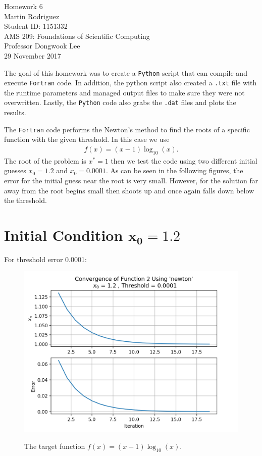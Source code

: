 \documentclass[12pt]{article}
\begin{document}
\begin{center}
	{\LARGE Homework 6} \\[10pt] 
	{ Martin Rodriguez} \\
	Student ID: 1151332\\
	AMS 209: Foundations of Scientific Computing\\
	Professor Dongwook Lee\\[10 pt]	
	29 November 2017 \\[30 pt]
\end{center}

The goal of this homework was to create a \texttt{Python} script that can compile and execute \texttt{Fortran} code. In addition, the python script also created a \texttt{.txt} file with the runtime parameters and managed output files to make sure they were not overwritten. Lastly, the \texttt{Python} code also grabs the \texttt{.dat} files and plots the results.

The \texttt{Fortran} code performs the Newton's method to find the roots of a specific function with the given threshold. In this case we use
\begin{align}
	f(x) = (x-1)\log_{10}(x).
\end{align} 
The root of the problem is $x^* = 1$ then we test the code using two different initial guesses $x_0 = 1.2$ and $x_0 = 0.0001$. As can be seen in the following figures, the error for the initial guess near the root is very small. However, for the solution far away from the root begins small then shoots up and once again falls down below the threshold.  

\newpage
\section*{{\large Initial Condition $\boldsymbol{x_0 = 1.2}$}}
	For threshold  error 0.0001:
	\begin{figure}[h]
		\caption{The target function $f(x) = (x-1)\log_{10}(x)$.}
		\centering
		\includegraphics[width=1.0\textwidth]{./figures/initial_condition_1/result_2_0001.png}
		\label{fig:plot2dot3}
	\end{figure}
	
\end{document}
